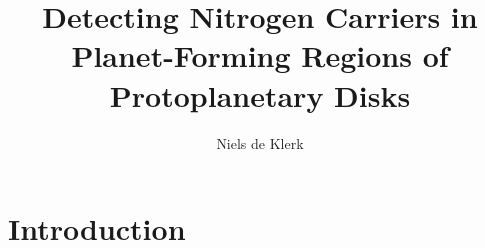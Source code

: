 \documentclass[oneside, single, authoryear, semicolon]{lion-msc}
\title{Detecting Nitrogen Carriers in Planet-Forming Regions of Protoplanetary Disks}
\author{Niels de Klerk}
\affiliation{Leiden Observatory, Universiteit Leiden}
\date{\displaydate{date}}
\newcommand{\4}{$_4$}
\newcommand{\3}{$_3$}
\newcommand{\2}{$_2$}
\begin{document}

\maketitle

\tableofcontents
\cleardoublepage
{}
\chapter{Introduction}


\end{document}
